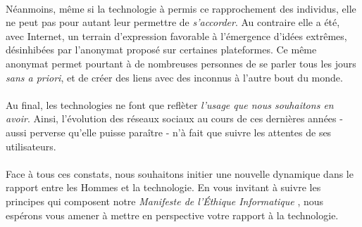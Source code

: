\paragraph{} Néanmoins, même si la technologie à permis ce rapprochement des individus, elle ne peut pas pour
autant leur permettre de \emph{s'accorder}. Au contraire elle a été, avec Internet, un terrain d'expression
favorable à l'émergence d'idées extrêmes, désinhibées par l'anonymat proposé sur certaines plateformes. Ce même
anonymat permet pourtant à de nombreuses personnes de se parler tous les jours \emph{sans a priori}, et de créer
des liens avec des inconnus à l'autre bout du monde.

\paragraph{} Au final, les technologies ne font que reflèter \emph{l'usage que nous souhaitons en avoir}. 
Ainsi, l'évolution des réseaux sociaux au cours de ces dernières années - aussi perverse qu'elle puisse paraître -
n'à fait que suivre les attentes de ses utilisateurs.

\paragraph{} Face à tous ces constats, nous souhaitons initier une nouvelle dynamique dans le rapport entre les
Hommes et la technologie. En vous invitant à suivre les principes qui composent notre \emph{Manifeste de l'Éthique
Informatique} \cite{FriesMilano0}, nous espérons vous amener à mettre en perspective votre rapport à la technologie.
